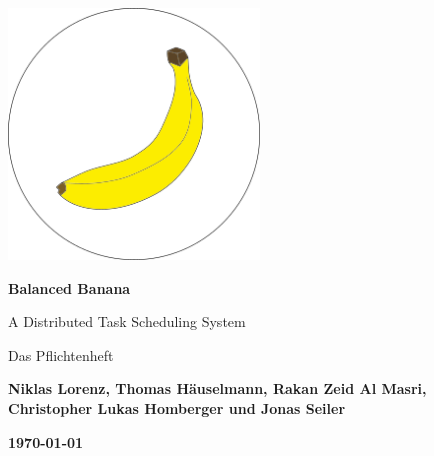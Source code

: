 \begin{titlepage}
    \begin{center}
    
     \vspace*{0.8cm}
 
        \includegraphics[width=0.5\textwidth]{balancedbanana_prototype}
        \vspace*{1cm}
 
        \Huge
        \textbf{Balanced Banana}
 
        \vspace{0.5cm}
        \LARGE
        A Distributed Task Scheduling System
        
        \vspace{0.5 cm}
        \LARGE
        Das Pflichtenheft
 
        \vspace{1.5cm}

        \large
        \textbf{Niklas Lorenz, Thomas Häuselmann, Rakan Zeid Al Masri, Christopher Lukas Homberger und Jonas Seiler}
 
        \vspace*{0.5cm}

        \textbf{\today}
 
       
        
 
    \end{center}
\end{titlepage}